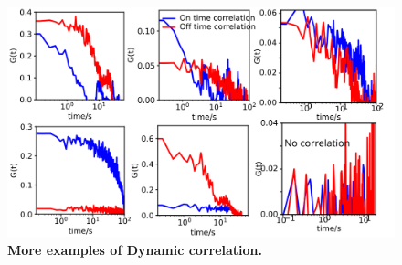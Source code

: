 \begin{figure}
  \centering
  \includegraphics[width=\textwidth]{Dynamic_corr_many}
  \caption{\textbf{More examples of Dynamic correlation.} 
  }
  \label{SIfig:Dynamic_corr_many}
\end{figure}
